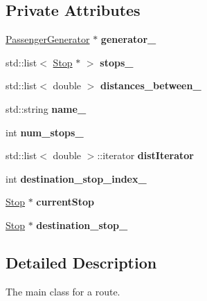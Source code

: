 \subsection*{Private Attributes}
\begin{DoxyCompactItemize}
\item 
\mbox{\label{classRoute_abb0d4a5df9055df459fb5f0b7ae2810e}} 
\hyperlink{classPassengerGenerator}{Passenger\+Generator} $\ast$ {\bfseries generator\+\_\+}
\item 
\mbox{\label{classRoute_a29357cad3848e8a3ff4dae57610968ee}} 
std\+::list$<$ \hyperlink{classStop}{Stop} $\ast$ $>$ {\bfseries stops\+\_\+}
\item 
\mbox{\label{classRoute_a307fe2f7f06105f4f3ae7172264fbcd7}} 
std\+::list$<$ double $>$ {\bfseries distances\+\_\+between\+\_\+}
\item 
\mbox{\label{classRoute_a89cf21e933b4599c2fa6dd21728539d9}} 
std\+::string {\bfseries name\+\_\+}
\item 
\mbox{\label{classRoute_ac54981fe7329c32eccbeaea86f7a62f1}} 
int {\bfseries num\+\_\+stops\+\_\+}
\item 
\mbox{\label{classRoute_aabece44a610bc4a061874026967ffe6a}} 
std\+::list$<$ double $>$\+::iterator {\bfseries dist\+Iterator}
\item 
\mbox{\label{classRoute_aac90998d2c10aa08885436874fb840f2}} 
int {\bfseries destination\+\_\+stop\+\_\+index\+\_\+}
\item 
\mbox{\label{classRoute_a5fea644d7493765558418a8f9fe29aa5}} 
\hyperlink{classStop}{Stop} $\ast$ {\bfseries current\+Stop}
\item 
\mbox{\label{classRoute_af702077267c252eae57caa0439b46f94}} 
\hyperlink{classStop}{Stop} $\ast$ {\bfseries destination\+\_\+stop\+\_\+}
\end{DoxyCompactItemize}


\subsection{Detailed Description}
The main class for a route. 

